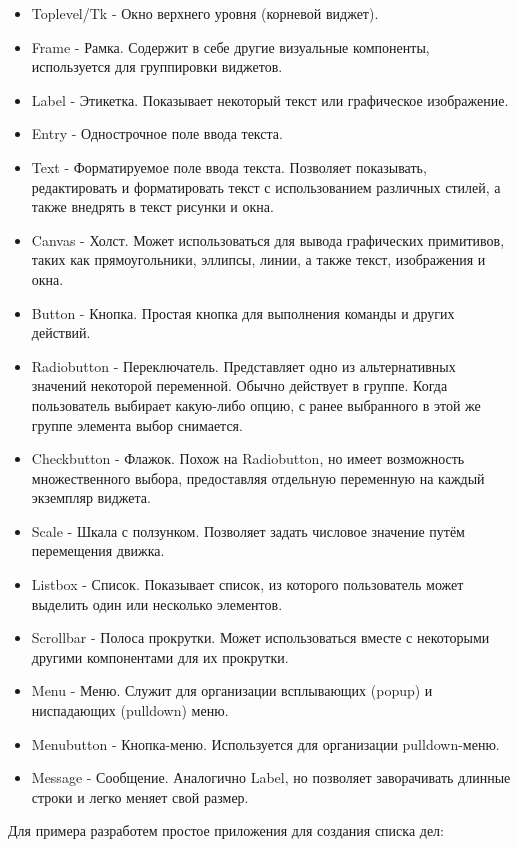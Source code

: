 \documentclass[a4paper]{article}
\begin{document}
\begin{itemize}
\item Toplevel/Tk - Окно верхнего уровня (корневой виджет).
\item Frame - Рамка. Содержит в себе другие визуальные компоненты, используется для группировки виджетов.
\item Label - Этикетка. Показывает некоторый текст или графическое изображение.
\item Entry - Однострочное поле ввода текста.
\item Text - Форматируемое поле ввода текста. Позволяет показывать, редактировать и форматировать текст с использованием различных стилей, а также внедрять в текст рисунки и окна.
\item Canvas - Холст. Может использоваться для вывода графических примитивов, таких как прямоугольники, эллипсы, линии, а также текст, изображения и окна.
\item Button - Кнопка. Простая кнопка для выполнения команды и других действий.
\item Radiobutton - Переключатель. Представляет одно из альтернативных значений некоторой переменной. Обычно действует в группе. Когда пользователь выбирает какую-либо опцию, с ранее выбранного в этой же группе элемента выбор снимается.
\item Checkbutton - Флажок. Похож на Radiobutton, но имеет возможность множественного выбора, предоставляя отдельную переменную на каждый экземпляр виджета.
\item Scale - Шкала с ползунком. Позволяет задать числовое значение путём перемещения движка.
\item Listbox - Список. Показывает список, из которого пользователь может выделить один или несколько элементов.
\item Scrollbar - Полоса прокрутки. Может использоваться вместе с некоторыми другими компонентами для их прокрутки.
\item Menu - Меню. Служит для организации всплывающих (popup) и ниспадающих (pulldown) меню.
\item Menubutton - Кнопка-меню. Используется для организации pulldown-меню.
\item Message - Сообщение. Аналогично Label, но позволяет заворачивать длинные строки и легко меняет свой размер.
\end{itemize}

Для примера разработем простое приложения для создания списка дел:
\end{document}
